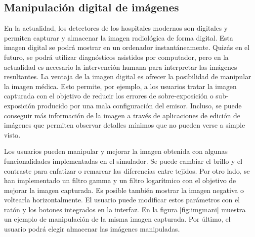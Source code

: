 \subsection{Manipulación digital de imágenes}
\label{xray:ajustes}

En la actualidad, los detectores de los hospitales modernos son digitales y permiten capturar y almacenar la imagen radiológica de forma digital. Esta imagen digital se podrá mostrar en un ordenador instantáneamente. Quizás en el futuro, se podrá utilizar diagnósticos asistidos por computador, pero en la actualidad es necesario la intervención humana para interpretar las imágenes resultantes. La ventaja de la imagen digital es ofrecer la posibilidad de manipular la imagen médica. Esto permite, por ejemplo, a los usuarios tratar la imagen capturada con el objetivo de reducir los errores de sobre-exposición o sub-exposición producido por una mala configuración del emisor. Incluso, se puede conseguir más información de la imagen a través de aplicaciones de edición de imágenes que permiten observar detalles mínimos que no pueden verse a simple vista.  

Los usuarios pueden manipular y mejorar la imagen obtenida con algunas funcionalidades implementadas en el simulador. Se puede cambiar el brillo y el contraste para enfatizar o remarcar las diferencias entre tejidos. Por otro lado, se han implementado un filtro gamma y un filtro logarítmico con el objetivo de mejorar la imagen capturada. Es posible también mostrar la imagen negativa o voltearla horizontalmente. El usuario puede modificar estos parámetros con el ratón y los botones integrados en la interfaz. En la figura \ref{fig:imgmani} muestra un ejemplo de manipulación de la misma imagen capturada. Por último, el usuario podrá elegir almacenar las imágenes manipuladas.%



